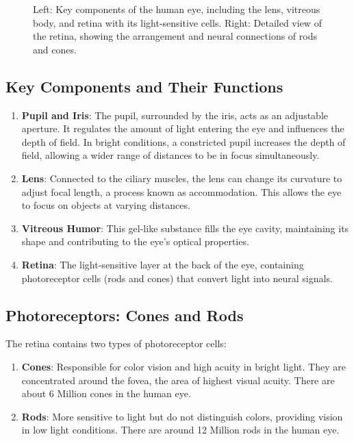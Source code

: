 \documentclass[
  a4paper,
]{book}
\begin{document}
\begin{figure}
\begin{minipage}{0.50\linewidth}
{}


\end{minipage}%

\caption{\label{fig-eye}Left: Key components of the human eye, including
the lens, vitreous body, and retina with its light-sensitive cells.
Right: Detailed view of the retina, showing the arrangement and neural
connections of rods and cones.}

\end{figure}%

\subsection{Key Components and Their
Functions}\label{key-components-and-their-functions}

\begin{enumerate}
\def\labelenumi{\arabic{enumi}.}
\item
  \textbf{Pupil and Iris}: The pupil, surrounded by the iris, acts as an
  adjustable aperture. It regulates the amount of light entering the eye
  and influences the depth of field. In bright conditions, a constricted
  pupil increases the depth of field, allowing a wider range of
  distances to be in focus simultaneously.
\item
  \textbf{Lens}: Connected to the ciliary muscles, the lens can change
  its curvature to adjust focal length, a process known as
  accommodation. This allows the eye to focus on objects at varying
  distances.
\item
  \textbf{Vitreous Humor}: This gel-like substance fills the eye cavity,
  maintaining its shape and contributing to the eye's optical
  properties.
\item
  \textbf{Retina}: The light-sensitive layer at the back of the eye,
  containing photoreceptor cells (rods and cones) that convert light
  into neural signals.
\end{enumerate}

\subsection{Photoreceptors: Cones and
Rods}\label{photoreceptors-cones-and-rods}

The retina contains two types of photoreceptor cells:

\begin{enumerate}
\def\labelenumi{\arabic{enumi}.}
\item
  \textbf{Cones}: Responsible for color vision and high acuity in bright
  light. They are concentrated around the fovea, the area of highest
  visual acuity. There are about 6 Million cones in the human eye.
\item
  \textbf{Rods}: More sensitive to light but do not distinguish colors,
  providing vision in low light conditions. There are around 12 Million
  rods in the human eye.
\end{enumerate}
\end{document}
